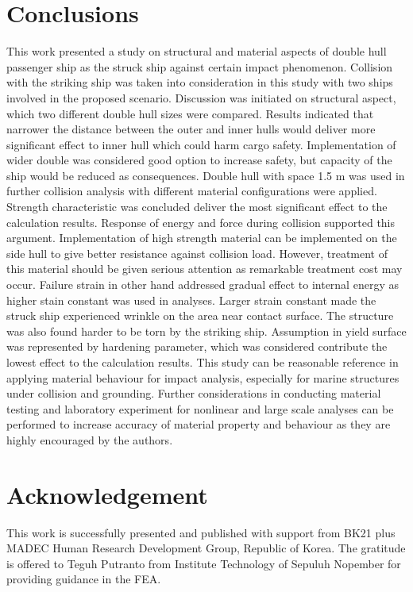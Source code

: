 \documentclass[10pt,journal]{IEEEtran}
\begin{document}
\section{Conclusions}

This work presented a study on structural and material aspects of double hull passenger ship as the struck ship against certain impact phenomenon. 
Collision with the striking ship was taken into consideration in this study with two ships involved in the proposed scenario. Discussion was initiated on structural aspect, which two different double hull sizes were compared. 
Results indicated that narrower the distance between the outer and inner hulls would deliver more significant effect to inner hull which could harm cargo safety. 
Implementation of wider double was considered good option to increase safety, but capacity of the ship would be reduced as consequences. 
Double hull with space 1.5 m was used in further collision analysis with different material configurations were applied. Strength characteristic was concluded deliver the most significant effect to the calculation results. 
Response of energy and force during collision supported this argument. Implementation of high strength material can be implemented on the side hull to give better resistance against collision load. 
However, treatment of this material should be given serious attention as remarkable treatment cost may occur. Failure strain in other hand addressed gradual effect to internal energy as higher stain constant was used in analyses. 
Larger strain constant made the struck ship experienced wrinkle on the area near contact surface. The structure was also found harder to be torn by the striking ship. 
Assumption in yield surface was represented by hardening parameter, which was considered contribute the lowest effect to the calculation results. 
This study can be reasonable reference in applying material behaviour for impact analysis, especially for marine structures under collision and grounding. 
Further considerations in conducting material testing and laboratory experiment for nonlinear and large scale analyses can be performed to increase accuracy of material property and behaviour as they are highly encouraged by the authors. 

\section*{Acknowledgement} 

This work is successfully presented and published with support from BK21 plus MADEC Human Research Development Group, Republic of Korea. 
The gratitude is offered to Teguh Putranto from Institute Technology of Sepuluh Nopember for providing guidance in the FEA. 




\end{document}
